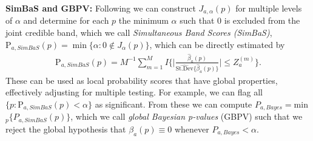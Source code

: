 \documentclass[11pt]{article}
\begin{document}
\textbf{SimBaS and GBPV:}  
Following \cite{meyer2015bayesian}
we can construct  $J_{a,\alpha}(p)$ for multiple levels of $\alpha$ and
determine for each $p$ the minimum $\alpha$ such that $0$ is excluded 
from the joint credible band, which we call {\it Simultaneous Band Scores (SimBaS)}, $\text{P}_{a,SimBaS}(p)=\min{\{\alpha: 0\not\in  J_{\alpha}(p) \}}$, which can be directly estimated by
   \begin{align*}
\text{P}_{a,SimBaS}(p)=  M^{-1}\sum_{m=1}^{M}I\biggl \{ 
\biggl |
\frac{ \hat\beta_a(p) }{\widehat{\text{St.Dev}}\{\hat \beta_a(p)\}}
\biggr |
\le Z_a^{(m)}
\biggr \}.  
\end{align*}  
These can be used as
local probability scores that have global properties, effectively adjusting for multiple testing.  For example, we can flag all $\{p:\text{P}_{a,SimBaS}(p)<\alpha\}$ as significant.
From these we can compute $P_{a,Bayes}=$min$_p\{P_{a,SimBaS}(p)\}$, which we call {\it global
Bayesian p-values} (GBPV) such that we  reject the global hypothesis that $\beta_a(p) \equiv 0$ whenever 
$P_{a,Bayes}<\alpha$.
\end{document}
